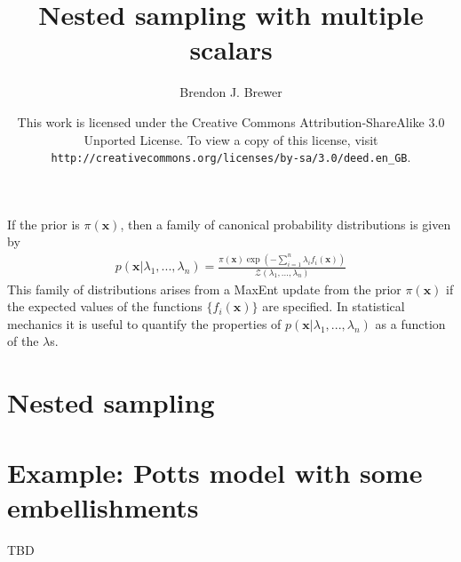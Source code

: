 \documentclass[a4paper, 11pt]{article}
\title{Nested sampling with multiple scalars}
\author{Brendon J. Brewer}
\date{\vspace{3cm}This work is licensed under the Creative Commons Attribution-ShareAlike 3.0 Unported License. To view a copy of this license, visit {\tt http://creativecommons.org/licenses/by-sa/3.0/deed.en\_GB}.}
\begin{document}
\maketitle

If the prior is $\pi(\mathbf{x})$, then a family of canonical
probability distributions is given by
\begin{eqnarray}
p(\mathbf{x} | \lambda_1, ..., \lambda_n) = 
\frac{\pi(\mathbf{x})\exp(-\sum_{i=1}^n \lambda_i f_i(\mathbf{x}))}
{\mathcal{Z}(\lambda_1, ..., \lambda_n)}
\end{eqnarray}
This family of distributions arises from a MaxEnt update from the prior
$\pi(\mathbf{x})$ if the expected values of the functions
$\{f_i(\mathbf{x})\}$ are specified. In statistical mechanics it is useful to
quantify the properties of
$p(\mathbf{x} | \lambda_1, ..., \lambda_n)$ as a function of the
$\lambda$s.

\section{Nested sampling}



\section{Example: Potts model with some embellishments}
TBD
\end{document}

